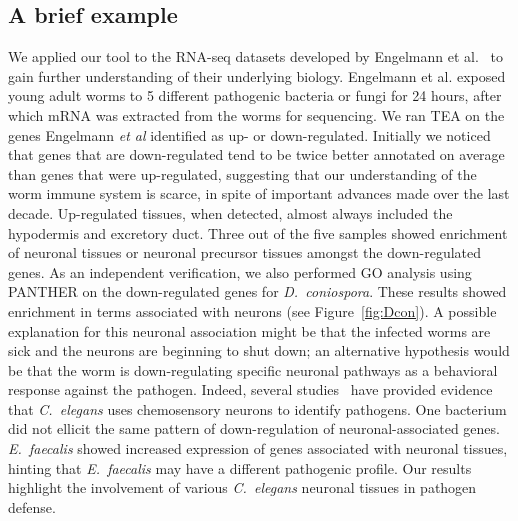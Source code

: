 \documentclass{bmcart}
\begin{document}
\subsection*{A brief example}
We applied our tool to the RNA-seq datasets developed by Engelmann et al.~\cite{Engelmann2011} to gain further understanding of their underlying biology. Engelmann et al. exposed young adult worms to 5 different pathogenic bacteria or fungi for 24 hours, after which mRNA was extracted from the worms for sequencing. We ran TEA on the genes Engelmann \emph{et al} identified as up- or down-regulated. Initially we noticed that genes that are down-regulated tend to be twice better annotated on average than genes that were up-regulated, suggesting that our understanding of the worm immune system is scarce, in spite of important advances made over the last decade. Up-regulated tissues, when detected, almost always included the hypodermis and excretory duct. Three out of the five samples showed enrichment of neuronal tissues or neuronal precursor tissues amongst the down-regulated genes. As an independent verification, we also performed GO analysis using PANTHER on the down-regulated genes for \emph{D.~coniospora}. These results showed enrichment in terms associated with neurons (see Figure~\ref{fig:Dcon}). A possible explanation for this neuronal association might be that the infected worms are sick and the neurons are beginning to shut down; an alternative hypothesis would be that the worm is down-regulating specific neuronal pathways as a behavioral response against the pathogen. Indeed, several studies~\cite{Meisel2014, Zhang2005} have provided evidence that \emph{C.~elegans} uses chemosensory neurons to identify pathogens. One bacterium did not ellicit the same pattern of down-regulation of neuronal-associated genes. \emph{E.~faecalis} showed increased expression of genes associated with neuronal tissues, hinting that \emph{E.~faecalis} may have a different pathogenic profile. Our results highlight the involvement of various \emph{C.~elegans} neuronal tissues in pathogen defense.
\end{document}
